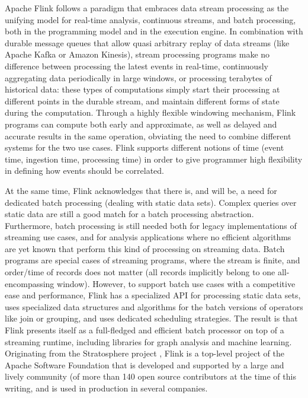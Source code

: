 Apache Flink follows a paradigm that embraces data stream processing as the unifying model for real-time analysis, continuous streams, and batch processing, both in the programming model and in the execution engine. In combination with durable message queues that allow quasi arbitrary replay of data streams (like Apache Kafka or Amazon Kinesis), stream processing programs make no difference between processing the latest events in real-time, continuously aggregating data periodically in large windows, or processing terabytes of historical data: these types of computations simply start their processing at different points in the durable stream, and maintain different forms of state during the computation. Through a highly flexible windowing mechanism, Flink programs can compute both early and approximate, as well as delayed and accurate results in the same operation, obviating the need to combine different systems for the two use cases. Flink supports different notions of time (event time, ingestion time, processing time) in order to give programmer high flexibility in defining how events should be correlated.
 
At the same time, Flink acknowledges that there is, and will be, a need for dedicated batch processing (dealing with static data sets). Complex queries over static data are still a good match for a batch processing abstraction. Furthermore, batch processing is still needed both for legacy implementations of streaming use cases, and for analysis applications where no efficient algorithms are yet known that perform this kind of processing on streaming data. Batch programs are special cases of streaming programs, where the stream is finite, and order/time of records does not matter (all records implicitly belong to one all-encompassing window). However, to support batch use cases with a competitive ease and performance, Flink has a specialized API for processing static data sets, uses specialized data structures and algorithms for the batch versions of operators like join or grouping, and uses dedicated scheduling strategies. The result is that Flink presents itself as a full-fledged and efficient batch processor on top of a streaming runtime, including libraries for graph analysis and machine learning. 
Originating from the Stratosphere project \cite{stratosphere}, Flink is a top-level project of the Apache Software Foundation that is developed and supported by a large and lively community (of more than 140 open source contributors at the time of this writing, and is used in production in several companies.

